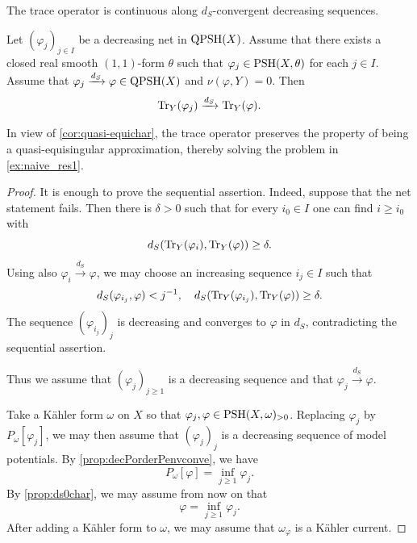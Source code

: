 The trace operator is continuous along $d_S$-convergent decreasing sequences.
\begin{proposition}\label{prop:tracedeclimit}
    Let $(\varphi_j)_{j\in I}$ be a decreasing net in $\mathrm{QPSH}(X)$. Assume that there exists a closed real smooth $(1,1)$-form $\theta$ such that $\varphi_j\in \mathrm{PSH}(X,\theta)$ for each $j\in I$. Assume that $\varphi_j\xrightarrow{d_S}\varphi\in \mathrm{QPSH}(X)$ and $\nu(\varphi,Y)=0$. Then
    \[
        \operatorname{Tr}_Y(\varphi_j)\xrightarrow{d_S}\operatorname{Tr}_Y(\varphi).
    \]
\end{proposition}
In view of \cref{cor:quasi-equichar}, the trace operator preserves the property of being a quasi-equisingular approximation, thereby solving the problem in \cref{ex:naive_res1}.
\begin{proof}
    It is enough to prove the sequential assertion. Indeed, suppose that the net statement fails. Then there is $\delta>0$ such that for every $i_0\in I$ one can find $i\geq i_0$ with
    \[
        d_S(\operatorname{Tr}_Y(\varphi_i),\operatorname{Tr}_Y(\varphi))\geq\delta.
    \]
    Using also $\varphi_i\xrightarrow{d_S}\varphi$, we may choose an increasing sequence $i_j\in I$ such that
    \[
        d_S(\varphi_{i_j},\varphi)<j^{-1},\quad d_S(\operatorname{Tr}_Y(\varphi_{i_j}),\operatorname{Tr}_Y(\varphi))\geq\delta.
    \]
    The sequence $(\varphi_{i_j})_j$ is decreasing and converges to $\varphi$ in $d_S$, contradicting the sequential assertion.

    Thus we assume that $(\varphi_j)_{j\geq 1}$ is a decreasing sequence and that $\varphi_j\xrightarrow{d_S}\varphi$.

    Take a Kähler form $\omega$ on $X$ so that $\varphi_j,\varphi\in \mathrm{PSH}(X,\omega)_{>0}$.  Replacing $\varphi_j$ by $P_{\omega}[\varphi_j]$, we may then assume that $(\varphi_j)_j$ is a decreasing sequence of model potentials. By \cref{prop:decPorderPenvconve}, we have
    \[
        P_{\omega}[\varphi]=\inf_{j\geq 1}\varphi_j.
    \]
    By \cref{prop:ds0char}, we may assume from now on that
    \[
        \varphi=\inf_{j\geq 1}\varphi_j.
    \]
    After adding a Kähler form to $\omega$, we may assume that $\omega_{\varphi}$ is a Kähler current.



\end{proof}
